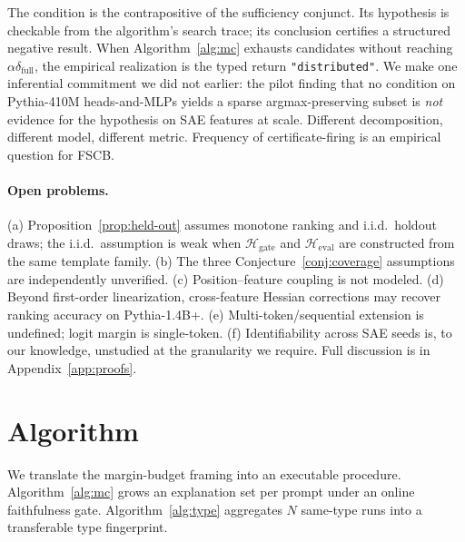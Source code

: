 \documentclass[10pt]{article}
\begin{document}
The condition is the contrapositive of the sufficiency conjunct. Its hypothesis is checkable from the algorithm's search trace; its conclusion certifies a structured negative result. When Algorithm~\ref{alg:mc} exhausts candidates without reaching $\alpha\delta_{\text{full}}$, the empirical realization is the typed return \texttt{"distributed"}. We make one inferential commitment we did not earlier: the pilot finding that no condition on Pythia-410M heads-and-MLPs yields a sparse argmax-preserving subset is \emph{not} evidence for the hypothesis on SAE features at scale. Different decomposition, different model, different metric. Frequency of certificate-firing is an empirical question for FSCB.

\paragraph{Open problems.} (a) Proposition~\ref{prop:held-out} assumes monotone ranking and i.i.d.\ holdout draws; the i.i.d.\ assumption is weak when $\mathcal{H}_{\text{gate}}$ and $\mathcal{H}_{\text{eval}}$ are constructed from the same template family. (b) The three Conjecture~\ref{conj:coverage} assumptions are independently unverified. (c) Position--feature coupling is not modeled. (d) Beyond first-order linearization, cross-feature Hessian corrections may recover ranking accuracy on Pythia-1.4B+. (e) Multi-token/sequential extension is undefined; logit margin is single-token. (f) Identifiability across SAE seeds is, to our knowledge, unstudied at the granularity we require. Full discussion is in Appendix~\ref{app:proofs}.

\section{Algorithm}
\label{sec:algorithm}

We translate the margin-budget framing into an executable procedure. Algorithm~\ref{alg:mc} grows an explanation set per prompt under an online faithfulness gate. Algorithm~\ref{alg:type} aggregates $N$ same-type runs into a transferable type fingerprint.
\end{document}
